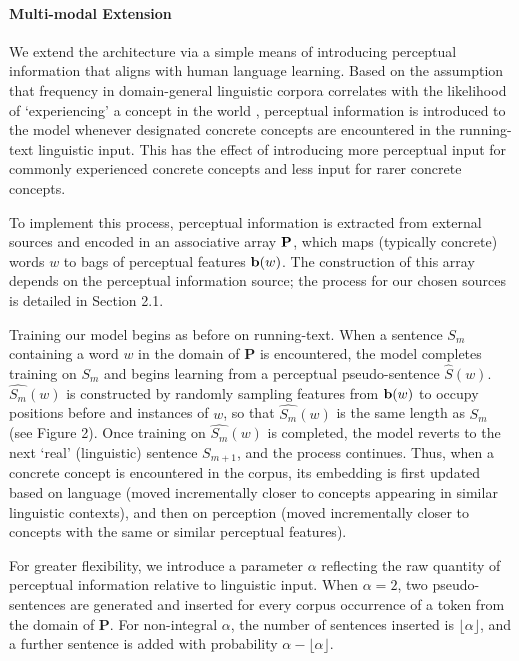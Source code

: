 \documentclass[11pt]{article}
\begin{document}
\paragraph{Multi-modal Extension} We extend the  architecture via a simple means of introducing perceptual information that aligns with human language learning. Based on the assumption that frequency in domain-general linguistic corpora correlates with the likelihood of `experiencing' a concept in the world \cite{bybee2001frequency,chater2006probabilistic}, perceptual information is introduced to the model whenever designated concrete concepts are encountered in the running-text linguistic input. This has the effect of introducing more perceptual input for commonly experienced concrete concepts and less input for rarer concrete concepts. 

To implement this process,  perceptual information is extracted from external sources and encoded in an associative array \(\bf{P}\), which maps (typically concrete) words \(w\) to bags of perceptual features \({\bf b}(w)\). The construction of this array depends on the perceptual information source; the process for our chosen sources is detailed in Section 2.1.  

Training our model begins as before on running-text. When a sentence \(S_m\) containing a word \(w\) in the domain of \(\mathbf{P}\) is encountered, the model completes training on \(S_m\) and begins learning from a perceptual pseudo-sentence \(\hat{S}(w)\).  \(\hat{S_m}(w)\) is constructed  by randomly sampling features from \({\bf b}(w)\) to occupy positions before and instances of \(w\), so that  \(\hat{S_m}(w)\) is the same length as \(S_m\) (see Figure 2). Once training on \(\hat{S_m}(w)\) is completed, the model reverts to the next `real' (linguistic) sentence \(S_{m+1}\), and the process continues. Thus, when a concrete concept is encountered in the corpus, its embedding is first updated based on language (moved incrementally closer to concepts appearing in similar linguistic contexts), and then on perception (moved incrementally closer to concepts with the same or similar perceptual features).  

For greater flexibility, we introduce a parameter \(\alpha\) reflecting the raw quantity of perceptual information relative to linguistic input. When \(\alpha=2\), two pseudo-sentences are generated and inserted for every corpus occurrence of a token from the domain of \(\mathbf{P}\). For non-integral \(\alpha \), the number of sentences inserted is \( \lfloor \alpha \rfloor \), and a further sentence is added with probability \(\alpha - \lfloor \alpha \rfloor \).
\end{document}
